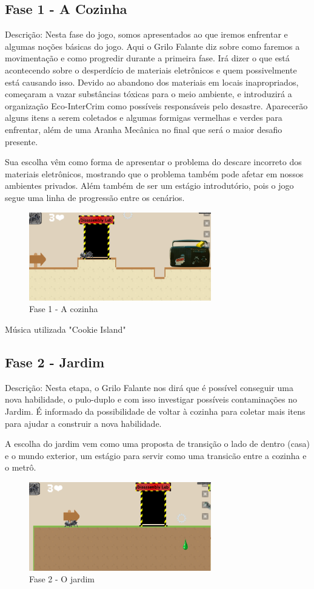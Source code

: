 \subsection{Fase 1 - A Cozinha}
Descrição: Nesta fase do jogo, somos apresentados ao que iremos enfrentar e algumas noções básicas do jogo. Aqui o Grilo Falante diz sobre como faremos a movimentação e como progredir durante a primeira fase. Irá dizer o que está acontecendo sobre o desperdício de materiais eletrônicos e quem possivelmente está causando isso. Devido ao abandono dos materiais em locais inapropriados, começaram a vazar substâncias tóxicas para o meio ambiente, e introduzirá a organização Eco-InterCrim como possíveis responsáveis pelo desastre.
Aparecerão alguns itens a serem coletados e algumas formigas vermelhas e verdes para enfrentar, além de uma Aranha Mecânica no final que será o maior desafio presente.

Sua escolha vêm como forma de apresentar o problema do descare incorreto dos materiais eletrônicos, mostrando que o problema também pode afetar em nossos ambientes privados. Além também de ser um estágio introdutório, pois o jogo segue uma linha de progressão entre os cenários.
\begin{figure}[h]
    \centering
    \includegraphics[width=300px]{figuras/cozinha.png}
    \caption{Fase 1 - A cozinha}
    \label{fig_cozinha}
\end{figure}

Música utilizada "Cookie Island" \cite{CookieIsland}

\subsection{Fase 2 - Jardim}

Descrição: Nesta etapa, o Grilo Falante nos dirá que é possível conseguir uma nova habilidade, o pulo-duplo e com isso investigar possíveis contaminações no Jardim. É informado da possibilidade de voltar à cozinha para coletar mais itens para ajudar a construir a nova habilidade.

A escolha do jardim vem como uma proposta de transição o lado de dentro (casa) e o mundo exterior, um estágio para servir como uma transicão entre a cozinha e o metrô.
\begin{figure}[h]
    \centering
    \includegraphics[width=300px]{figuras/jardim.png}
    \caption{Fase 2 - O jardim}
    \label{fig_jardim}
\end{figure}


